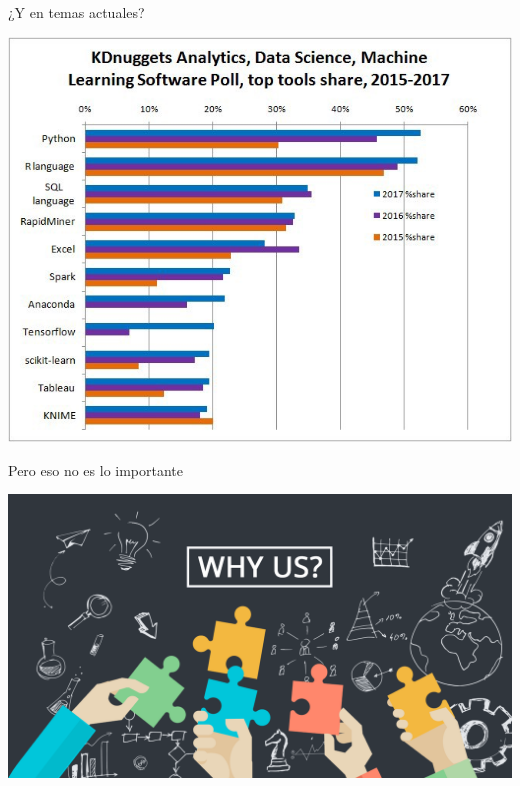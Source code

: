 \documentclass[bigger,unknownkeysallowed]{beamer}
\begin{document}
\begin{frame}[label={sec:org261f518}]{¿Y en temas actuales?}
\begin{center}
\includegraphics[height=\textheight]{python_machine_learning.png}
\end{center}
\end{frame}

\begin{frame}[label={sec:org7ea6c9e}]{Pero eso no es lo importante}
\begin{center}
\begin{center}
\includegraphics[width=\textwidth]{whyus.png}
\end{center}
\end{center}
\end{frame}
\end{document}
